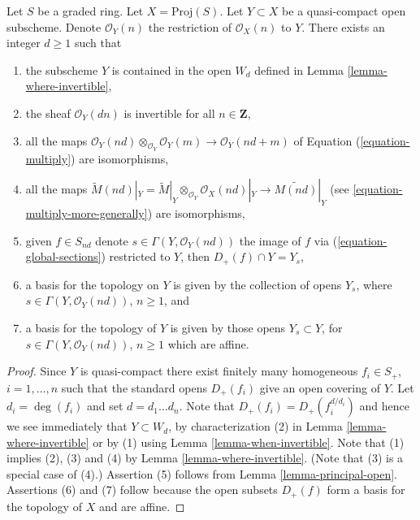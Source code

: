 \begin{lemma}
\label{lemma-ample-on-proj}
Let $S$ be a graded ring.
Let $X = \text{Proj}(S)$.
Let $Y \subset X$ be a quasi-compact open subscheme.
Denote $\mathcal{O}_Y(n)$ the restriction of
$\mathcal{O}_X(n)$ to $Y$.
There exists an integer $d \geq 1$ such that
\begin{enumerate}
\item the subscheme $Y$ is contained in the open $W_d$ defined
in Lemma \ref{lemma-where-invertible},
\item the sheaf $\mathcal{O}_Y(dn)$ is invertible for all $n \in \mathbf{Z}$,
\item all the maps
$\mathcal{O}_Y(nd) \otimes_{\mathcal{O}_Y} \mathcal{O}_Y(m)
\longrightarrow
\mathcal{O}_Y(nd + m)$
of Equation (\ref{equation-multiply}) are isomorphisms,
\item all the maps
$\widetilde M(nd)|_Y = \widetilde M|_Y \otimes_{\mathcal{O}_Y}
\mathcal{O}_X(nd)|_Y \to \widetilde{M(nd)}|_Y$
(see \ref{equation-multiply-more-generally}) are isomorphisms,
\item given $f \in S_{nd}$ denote $s \in \Gamma(Y, \mathcal{O}_Y(nd))$
the image of $f$ via (\ref{equation-global-sections})
restricted to $Y$, then $D_{+}(f) \cap Y = Y_s$,
\item a basis for the topology on $Y$ is given
by the collection of opens $Y_s$, where $s \in \Gamma(Y, \mathcal{O}_Y(nd))$,
$n \geq 1$, and
\item a basis for the topology of $Y$ is given
by those opens $Y_s \subset Y$, for
$s \in \Gamma(Y, \mathcal{O}_Y(nd))$, $n \geq 1$ which are affine.
\end{enumerate}
\end{lemma}

\begin{proof}
Since $Y$ is quasi-compact there exist finitely many homogeneous
$f_i \in S_{+}$, $i = 1, \ldots, n$ such that the standard opens
$D_{+}(f_i)$ give an open covering of $Y$. Let $d_i = \deg(f_i)$ and set
$d = d_1 \ldots d_n$. Note that $D_{+}(f_i) = D_{+}(f_i^{d/d_i})$
and hence we see immediately that $Y \subset W_d$, by characterization
(2) in Lemma \ref{lemma-where-invertible} or
by (1) using Lemma \ref{lemma-when-invertible}.
Note that (1) implies (2), (3) and (4) by Lemma \ref{lemma-where-invertible}.
(Note that (3) is a special case of (4).)
Assertion (5) follows from Lemma \ref{lemma-principal-open}.
Assertions (6) and (7) follow because the open subsets $D_{+}(f)$
form a basis for the topology of $X$ and are affine.
\end{proof}


